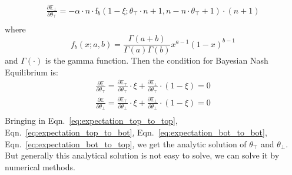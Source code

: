 \documentclass[11pt]{article}
\begin{document}
  \begin{equation}
    \label{eq:expectation_bot_to_top}
    \begin{aligned}
    \frac{\partial{\mathbb{E}}_\bot}{\partial{\theta_\top}}= -\alpha\cdot n \cdot  \text{f}_b(1-\xi;\theta_\top\cdot n+1,n-n\cdot\theta_\top+1)\cdot(n+1)\\
    \end{aligned}
  \end{equation}
  where $$f_b(x;a,b)=\frac{\Gamma(a+b)}{\Gamma(a)\Gamma(b)}x^{a-1}(1-x)^{b-1}$$ and $\Gamma(\cdot)$ is the gamma function.
  Then the condition for Bayesian Nash Equilibrium is:
  \begin{equation}
    \label{eq:partial_theta}
    \begin{aligned}
      \frac{\partial{\mathbb{E}}}{\partial{\theta_\top}}=\frac{\partial{\mathbb{E}_\top}}{\partial{\theta_\top}}\cdot\xi+\frac{\partial{\mathbb{E}_\bot}}{\partial{\theta_\top}}\cdot(1-\xi)= 0\\
      \frac{\partial{\mathbb{E}}}{\partial{\theta_\bot}}=\frac{\partial{\mathbb{E}_\top}}{\partial{\theta_\bot}}\cdot\xi+\frac{\partial{\mathbb{E}_\bot}}{\partial{\theta_\bot}}\cdot(1-\xi)= 0\\
    \end{aligned}
  \end{equation}
  Bringing in Eqn.~\ref{eq:expectation_top_to_top}, Eqn.~\ref{eq:expectation_top_to_bot}, Eqn.~\ref{eq:expectation_bot_to_bot}, Eqn.~\ref{eq:expectation_bot_to_top}, we get the analytic solution of $\theta_\top$ and $\theta_\bot$. But generally this analytical solution is not easy to solve, we can solve it by numerical methods.
  
\end{document}
